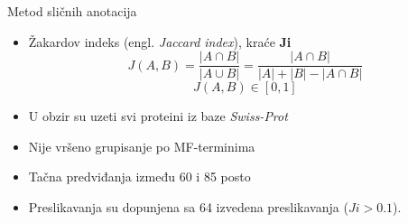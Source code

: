 \documentclass{beamer}
\newcommand{\en}[1]{(engl. \textit{#1})}
\newcommand{\keyword}[1]{\textbf{#1}}
\newcommand{\swissprot}{\textit{Swiss-Prot} }
\begin{document}
%


\begin{frame}{Metod sličnih anotacija}
  \begin{itemize}
      \pause
    \item Žakardov indeks \en{Jaccard index}, kraće \keyword{Ji}  
$$J(A,B) = \dfrac{|A \cap B|}{|A \cup B|} =  \dfrac{|A \cap B|}{|A|+|B|-|A \cap B|}$$
$$  J(A,B) \in [0, 1] $$

      \pause
  \item U obzir su uzeti svi proteini iz baze \swissprot
      \pause
  \item Nije vršeno grupisanje po MF-terminima
      \pause
  \item Tačna predviđanja između 60 i 85 posto
      \pause
  \item Preslikavanja su dopunjena sa 64 izvedena preslikavanja ($Ji>0.1$).

  \end{itemize}
\end{frame}
\end{document}
